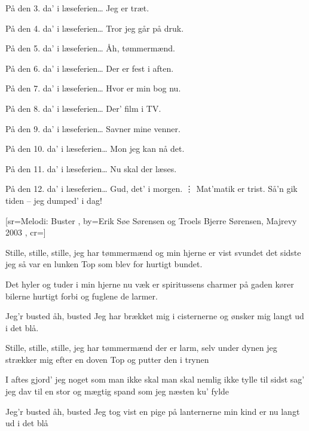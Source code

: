 \documentclass[pdftex,12pt]{article}
\begin{document}
\begin{songs}{}
\beginverse
På den 3. da’ i læseferien\ldots
Jeg er træt.
\endverse

\beginverse
På den 4. da’ i læseferien\ldots
Tror jeg går på druk.
\endverse

\beginverse
På den 5. da’ i læseferien\ldots
Åh, tømmermænd.
\endverse

\beginverse
På den 6. da’ i læseferien\ldots
Der er fest i aften.
\endverse

\beginverse
På den 7. da’ i læseferien\ldots
Hvor er min bog nu.
\endverse

\beginverse
På den 8. da’ i læseferien\ldots
Der' film i TV.
\endverse

\beginverse
På den 9. da’ i læseferien\ldots
Savner mine venner.
\endverse

\beginverse
På den 10. da’ i læseferien\ldots
Mon jeg kan nå det.
\endverse

\beginverse
På den 11. da’ i læseferien\ldots
Nu skal der læses.
\endverse

\beginverse
På den 12. da’ i læseferien\ldots
Gud, det' i morgen.
\hspace{0em}\phantom{M}\vdots
Mat’matik er trist.
Så'n gik tiden -- jeg dumped' i dag!
\endverse
\endsong



[sr={Melodi: Buster}
,
by={Erik Søe Sørensen og Troels Bjerre Sørensen, Majrevy 2003}
,
cr={}]\hypertarget{Bust'ed}{}
\label{song34}

\beginverse
Stille, stille, stille, jeg har tømmermænd
og min hjerne er vist svundet
det sidste jeg så var en lunken Top
som blev for hurtigt bundet.

\endverse
\beginverse
Det hyler og tuder i min hjerne nu
væk er spiritussens charmer
på gaden kører bilerne hurtigt forbi
og fuglene de larmer.

\endverse
\beginverse
Jeg’r busted
åh, busted
Jeg har brækket mig i cisternerne
og ønsker mig langt ud i det blå.

\endverse
\beginverse
Stille, stille, stille, jeg har tømmermænd
der er larm, selv under dynen
jeg strækker mig efter en doven Top
og putter den i trynen

\endverse
\beginverse
I aftes gjord’ jeg noget som man ikke skal
man skal nemlig ikke tylle
til sidst sag’ jeg dav til en stor og mægtig spand
som jeg næsten ku’ fylde

\endverse
\beginverse
Jeg’r busted
åh, busted
Jeg tog vist en pige på lanternerne
min kind er nu langt ud i det blå


\end{songs}
\end{document}
